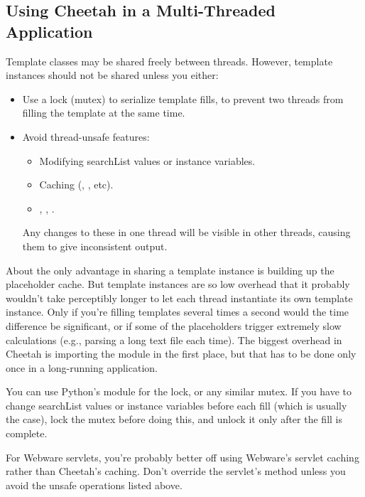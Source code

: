 \subsection{Using Cheetah in a Multi-Threaded Application}
\label{tips.threads}

Template classes may be shared freely between threads.  However, template
instances should not be shared unless you either:
\begin{itemize}
\item Use a lock (mutex) to serialize template fills, to prevent two threads
from filling the template at the same time.
\item Avoid thread-unsafe features:
    \begin{itemize}
    \item Modifying searchList values or instance variables.
    \item Caching (, , etc).
    \item {}, , .
    \end{itemize}
    Any changes to these in one thread will be visible in other threads,
    causing them to give inconsistent output.
\end{itemize}

About the only advantage in sharing a template instance is building up the
placeholder cache.  But template instances are so low overhead that it
probably wouldn't take perceptibly longer to let each thread instantiate its
own template instance.  Only if you're filling templates several times a
second would the time difference be significant, or if some of the placeholders
trigger extremely slow calculations (e.g., parsing a long text file each time).
The biggest overhead in Cheetah is importing the  module in
the first place, but that has to be done only once in a long-running
application.

You can use Python's  module for the lock, or any similar
mutex.  If you have to change searchList values or instance variables
before each fill (which is usually the case), lock the mutex before 
doing this, and unlock it only after the fill is complete.

For Webware servlets, you're probably better off using Webware's servlet
caching rather than Cheetah's caching.  Don't override the servlet's
 method unless you avoid the unsafe operations
listed above.


